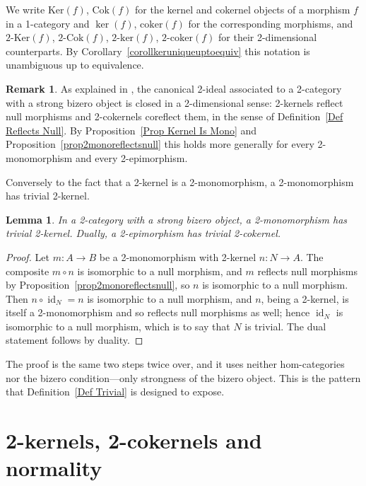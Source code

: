 \documentclass[reqno,a4paper]{amsart}
\numberwithin{equation}{section}
\theoremstyle{plain}
\newtheorem{lemma}[subsection]{Lemma}
\theoremstyle{definition}
\newtheorem{remark}[subsection]{Remark}
\def\nameit#1{\textrm{#1}~}
\def\prox{\nameit{Proposition}}
\def\corx{\nameit{Corollary}}
\def\defx{\nameit{Definition}}
\newcommand{\comp}{\circ}
\renewcommand{\1}{\onecat{1}}
\newcommand{\Ker}{\ensuremath{\mathrm{Ker}}}
\newcommand{\Coker}{\ensuremath{\mathrm{Cok}}}
\newcommand{\coker}{\ensuremath{\mathrm{coker}}}
\newcommand{\TwoKer}{\ensuremath{2\text{-}\mathrm{Ker}}}
\newcommand{\TwoCoker}{\ensuremath{2\text{-}\mathrm{Cok}}}
\newcommand{\twoker}{\ensuremath{2\text{-}\mathrm{ker}}}
\newcommand{\twocoker}{\ensuremath{2\text{-}\mathrm{coker}}}
\newcommand{\id}[1]{\operatorname{id}_{#1}}
\begin{document}
We write \(\Ker(f)\), \(\Coker(f)\) for the kernel and cokernel objects of a morphism \(f\) in a 1-category and \(\ker(f)\), \(\coker(f)\) for the corresponding morphisms, and \(\TwoKer(f)\), \(\TwoCoker(f)\), \(\twoker(f)\), \(\twocoker(f)\) for their 2-dimensional counterparts. By \corx\ref{corollkeruniqueuptoequiv} this notation is unambiguous up to equivalence.

\begin{remark}\label{Rem Ideal Closed}
	As explained in \cite[Definition~2.20 and Proposition~4.11]{CavJanMes25}, the canonical 2-ideal associated to a 2-category with a strong bizero object is closed in a 2-dimensional sense: 2-kernels reflect null morphisms and 2-cokernels coreflect them, in the sense of \defx\ref{Def Reflects Null}. By \prox\ref{Prop Kernel Is Mono} and \prox\ref{prop2monoreflectsnull} this holds more generally for every 2-monomorphism and every 2-epimorphism.
\end{remark}

Conversely to the fact that a 2-kernel is a 2-monomorphism, a 2-monomorphism has trivial 2-kernel.

\begin{lemma}\label{2-Mono Trivial Kernel}
	In a 2-category with a strong bizero object, a 2-monomorphism has trivial 2-kernel. Dually, a 2-epimorphism has trivial 2-cokernel.
\end{lemma}
\begin{proof}
	Let \(m\colon A\to B\) be a 2-monomorphism with 2-kernel \(n\colon N\to A\). The composite \(m\comp n\) is isomorphic to a null morphism, and \(m\) reflects null morphisms by \prox\ref{prop2monoreflectsnull}, so \(n\) is isomorphic to a null morphism. Then \(n\comp\id{N}=n\) is isomorphic to a null morphism, and \(n\), being a 2-kernel, is itself a 2-monomorphism and so reflects null morphisms as well; hence \(\id{N}\) is isomorphic to a null morphism, which is to say that \(N\) is trivial. The dual statement follows by duality.
\end{proof}

The proof is the same two steps twice over, and it uses neither hom-categories nor the bizero condition---only strongness of the bizero object. This is the pattern that \defx\ref{Def Trivial} is designed to expose.

\section{2-kernels, 2-cokernels and normality}\label{S:Normality}
\end{document}
